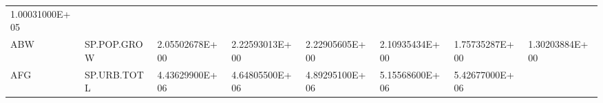 \documentclass[]{article}
\begin{document}
\begin{longtable}[]{@{}llllllll@{}}
\begin{minipage}[t]{0.11\columnwidth}
1.00031000E+05\strut
\end{minipage}\tabularnewline
\begin{minipage}[t]{0.06\columnwidth}\raggedright
ABW\strut
\end{minipage} & \begin{minipage}[t]{0.08\columnwidth}\raggedright
SP.POP.GROW\strut
\end{minipage} & \begin{minipage}[t]{0.11\columnwidth}\raggedright
2.05502678E+00\strut
\end{minipage} & \begin{minipage}[t]{0.11\columnwidth}\raggedright
2.22593013E+00\strut
\end{minipage} & \begin{minipage}[t]{0.11\columnwidth}\raggedright
2.22905605E+00\strut
\end{minipage} & \begin{minipage}[t]{0.11\columnwidth}\raggedright
2.10935434E+00\strut
\end{minipage} & \begin{minipage}[t]{0.11\columnwidth}\raggedright
1.75735287E+00\strut
\end{minipage} & \begin{minipage}[t]{0.11\columnwidth}\raggedright
1.30203884E+00\strut
\end{minipage}\tabularnewline
\begin{minipage}[t]{0.06\columnwidth}\raggedright
AFG\strut
\end{minipage} & \begin{minipage}[t]{0.08\columnwidth}\raggedright
SP.URB.TOTL\strut
\end{minipage} & \begin{minipage}[t]{0.11\columnwidth}\raggedright
4.43629900E+06\strut
\end{minipage} & \begin{minipage}[t]{0.11\columnwidth}\raggedright
4.64805500E+06\strut
\end{minipage} & \begin{minipage}[t]{0.11\columnwidth}\raggedright
4.89295100E+06\strut
\end{minipage} & \begin{minipage}[t]{0.11\columnwidth}\raggedright
5.15568600E+06\strut
\end{minipage} & \begin{minipage}[t]{0.11\columnwidth}\raggedright
5.42677000E+06\strut
\end{minipage} & \begin{minipage}[t]{0.11\columnwidth}\raggedright

\end{minipage}
\end{longtable}
\end{document}
